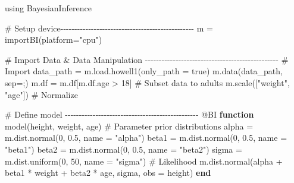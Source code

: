 \documentclass[
  letterpaper,
  DIV=11,
  numbers=noendperiod]{scrartcl}
\newenvironment{Shaded}{\begin{snugshade}}{\end{snugshade}}
\newcommand{\BuiltInTok}[1]{\textcolor[rgb]{0.00,0.23,0.31}{#1}}
\newcommand{\CharTok}[1]{\textcolor[rgb]{0.13,0.47,0.30}{#1}}
\newcommand{\CommentTok}[1]{\textcolor[rgb]{0.37,0.37,0.37}{#1}}
\newcommand{\ConstantTok}[1]{\textcolor[rgb]{0.56,0.35,0.01}{#1}}
\newcommand{\FloatTok}[1]{\textcolor[rgb]{0.68,0.00,0.00}{#1}}
\newcommand{\FunctionTok}[1]{\textcolor[rgb]{0.28,0.35,0.67}{#1}}
\newcommand{\ImportTok}[1]{\textcolor[rgb]{0.00,0.46,0.62}{#1}}
\newcommand{\KeywordTok}[1]{\textcolor[rgb]{0.00,0.23,0.31}{\textbf{#1}}}
\newcommand{\NormalTok}[1]{\textcolor[rgb]{0.00,0.23,0.31}{#1}}
\newcommand{\OperatorTok}[1]{\textcolor[rgb]{0.37,0.37,0.37}{#1}}
\newcommand{\PreprocessorTok}[1]{\textcolor[rgb]{0.68,0.00,0.00}{#1}}
\newcommand{\StringTok}[1]{\textcolor[rgb]{0.13,0.47,0.30}{#1}}
\begin{document}
\begin{Shaded}
\begin{Highlighting}[]
\ImportTok{using} \BuiltInTok{BayesianInference}

\CommentTok{\# Setup device{-}{-}{-}{-}{-}{-}{-}{-}{-}{-}{-}{-}{-}{-}{-}{-}{-}{-}{-}{-}{-}{-}{-}{-}{-}{-}{-}{-}{-}{-}{-}{-}{-}{-}{-}{-}{-}{-}{-}{-}{-}{-}{-}{-}{-}{-}{-}{-}}
\NormalTok{m }\OperatorTok{=} \FunctionTok{importBI}\NormalTok{(platform}\OperatorTok{=}\StringTok{"cpu"}\NormalTok{)}

\CommentTok{\# Import Data \& Data Manipulation {-}{-}{-}{-}{-}{-}{-}{-}{-}{-}{-}{-}{-}{-}{-}{-}{-}{-}{-}{-}{-}{-}{-}{-}{-}{-}{-}{-}{-}{-}{-}{-}{-}{-}{-}{-}{-}{-}{-}{-}{-}{-}{-}{-}{-}{-}{-}{-}}
\CommentTok{\# Import}
\NormalTok{data\_path }\OperatorTok{=}\NormalTok{ m.load.}\FunctionTok{howell1}\NormalTok{(only\_path }\OperatorTok{=} \ConstantTok{true}\NormalTok{)}
\NormalTok{m.}\FunctionTok{data}\NormalTok{(data\_path, sep}\OperatorTok{=}\CharTok{\textquotesingle{};\textquotesingle{}}\NormalTok{) }
\NormalTok{m.df }\OperatorTok{=}\NormalTok{ m.df[m.df.age }\OperatorTok{\textgreater{}} \FloatTok{18}\NormalTok{] }\CommentTok{\# Subset data to adults}
\NormalTok{m.}\FunctionTok{scale}\NormalTok{([}\StringTok{"weight"}\NormalTok{, }\StringTok{"age"}\NormalTok{]) }\CommentTok{\# Normalize}

\CommentTok{\# Define model {-}{-}{-}{-}{-}{-}{-}{-}{-}{-}{-}{-}{-}{-}{-}{-}{-}{-}{-}{-}{-}{-}{-}{-}{-}{-}{-}{-}{-}{-}{-}{-}{-}{-}{-}{-}{-}{-}{-}{-}{-}{-}{-}{-}{-}{-}{-}{-}}
\PreprocessorTok{@BI} \KeywordTok{function} \FunctionTok{model}\NormalTok{(height, weight, age)}
    \CommentTok{\# Parameter prior distributions}
\NormalTok{    alpha }\OperatorTok{=}\NormalTok{ m.dist.}\FunctionTok{normal}\NormalTok{(}\FloatTok{0}\NormalTok{, }\FloatTok{0.5}\NormalTok{, name }\OperatorTok{=} \StringTok{"alpha"}\NormalTok{)    }
\NormalTok{    beta1 }\OperatorTok{=}\NormalTok{ m.dist.}\FunctionTok{normal}\NormalTok{(}\FloatTok{0}\NormalTok{, }\FloatTok{0.5}\NormalTok{, name }\OperatorTok{=} \StringTok{"beta1"}\NormalTok{)}
\NormalTok{    beta2 }\OperatorTok{=}\NormalTok{ m.dist.}\FunctionTok{normal}\NormalTok{(}\FloatTok{0}\NormalTok{, }\FloatTok{0.5}\NormalTok{, name }\OperatorTok{=} \StringTok{"beta2"}\NormalTok{)}
\NormalTok{    sigma }\OperatorTok{=}\NormalTok{ m.dist.}\FunctionTok{uniform}\NormalTok{(}\FloatTok{0}\NormalTok{, }\FloatTok{50}\NormalTok{, name }\OperatorTok{=} \StringTok{"sigma"}\NormalTok{)}
    \CommentTok{\# Likelihood}
\NormalTok{    m.dist.}\FunctionTok{normal}\NormalTok{(alpha }\OperatorTok{+}\NormalTok{ beta1 }\OperatorTok{*}\NormalTok{ weight }\OperatorTok{+}\NormalTok{ beta2 }\OperatorTok{*}\NormalTok{ age, sigma, obs }\OperatorTok{=}\NormalTok{ height)}
\KeywordTok{end}


\end{Highlighting}
\end{Shaded}
\end{document}
